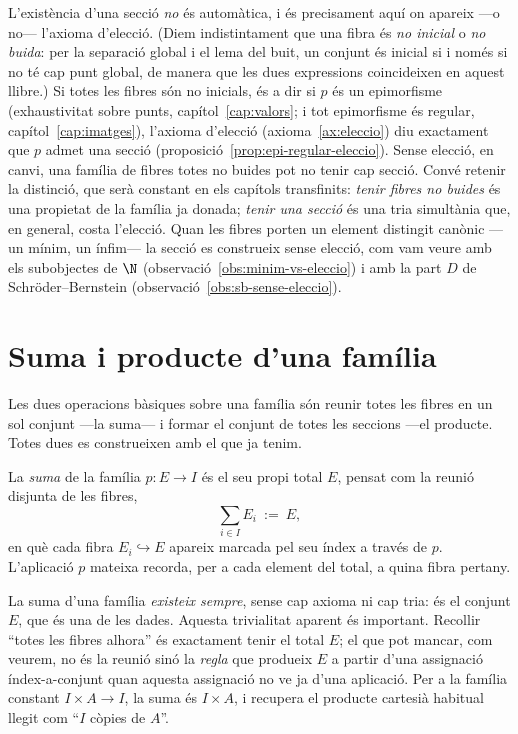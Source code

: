 \begin{observacio}\label{obs:seccio-eleccio}
L'existència d'una secció \emph{no} és automàtica, i és precisament aquí on
apareix ---o no--- l'axioma d'elecció. (Diem indistintament que una fibra és
\emph{no inicial} o \emph{no buida}: per la separació global i el lema del
buit, un conjunt és inicial si i només si no té cap punt global, de manera
que les dues expressions coincideixen en aquest llibre.) Si totes les fibres són no inicials,
és a dir si \(p\) és un epimorfisme (exhaustivitat sobre punts,
capítol~\ref{cap:valors}; i tot epimorfisme és regular,
capítol~\ref{cap:imatges}), l'axioma d'elecció
(axioma~\ref{ax:eleccio}) diu exactament que \(p\) admet una secció
(proposició~\ref{prop:epi-regular-eleccio}). Sense elecció, en canvi, una
família de fibres totes no buides pot no tenir cap secció. Convé retenir la
distinció, que serà constant en els capítols transfinits: \emph{tenir
fibres no buides} és una propietat de la família ja donada; \emph{tenir una
secció} és una tria simultània que, en general, costa l'elecció. Quan les
fibres porten un element distingit canònic ---un mínim, un ínfim--- la secció
es construeix sense elecció, com vam veure amb els subobjectes de \(\N\)
(observació~\ref{obs:minim-vs-eleccio}) i amb la part \(D\) de
Schröder--Bernstein (observació~\ref{obs:sb-sense-eleccio}).
\end{observacio}

\section{Suma i producte d'una família}\label{sec:suma-producte}

Les dues operacions bàsiques sobre una família són reunir totes les fibres
en un sol conjunt ---la suma--- i formar el conjunt de totes les seccions
---el producte. Totes dues es construeixen amb el que ja tenim.

\begin{definicio}\label{def:suma-familia}
La \emph{suma} de la família \(p\colon E\to I\) és el seu propi total \(E\),
pensat com la reunió disjunta de les fibres,
\[
\sum_{i\in I}E_i\ :=\ E,
\]
en què cada fibra \(E_i\hookrightarrow E\) apareix marcada pel seu índex a
través de \(p\). L'aplicació \(p\) mateixa recorda, per a cada element del
total, a quina fibra pertany.
\end{definicio}

\begin{observacio}\label{obs:suma-existeix}
La suma d'una família \emph{existeix sempre}, sense cap axioma ni cap tria:
és el conjunt \(E\), que és una de les dades. Aquesta trivialitat aparent és
important. Recollir \enquote{totes les fibres alhora} és exactament tenir el
total \(E\); el que pot mancar, com veurem, no és la reunió sinó la
\emph{regla} que produeix \(E\) a partir d'una assignació índex-a-conjunt
quan aquesta assignació no ve ja d'una aplicació. Per a la família constant
\(I\times A\to I\), la suma és \(I\times A\), i recupera el producte
cartesià habitual llegit com \enquote{\(I\) còpies de \(A\)}.
\end{observacio}

